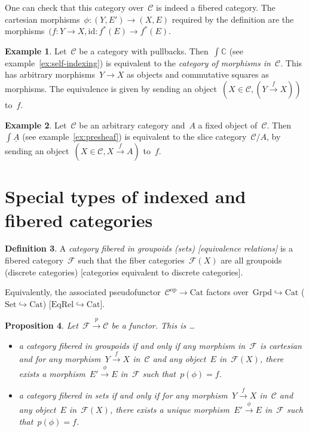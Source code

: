 \documentclass[a4paper,english,12pt]{scrartcl}
\theoremstyle{definition}
\newtheorem{defn}{Definition}[section]
\newtheorem{ex}[defn]{Example}
\theoremstyle{plain}
\newtheorem{prop}[defn]{Proposition}
\theoremstyle{remark}
\newcommand{\CC}{\mathbb{C}}
\newcommand{\C}{\mathcal{C}}
\newcommand{\F}{\mathcal{F}}
\newcommand{\id}{\mathrm{id}}
\newcommand{\op}{\mathrm{op}}
\newcommand{\xra}[1]{\xrightarrow{#1}}
\newcommand{\Set}{\mathrm{Set}}
\newcommand{\Cat}{\mathrm{Cat}}
\newcommand{\ul}[1]{\underline{#1}}
\begin{document}
One can check that this category over~$\C$ is indeed a fibered category. The
cartesian morphisms~$\phi : (Y,E') \to (X,E)$ required by the definition are
the morphisms~$(f : Y \to X, \id : f^*(E) \to f^*(E)$.

\begin{ex}Let~$\C$ be a category with pullbacks. Then~$\int \CC$ (see
example~\ref{ex:self-indexing}) is equivalent to the \emph{category of morphisms
in~$\C$}. This has arbitrary morphisms~$Y \to X$ as objects and commutative
squares as morphisms. The equivalence is given by sending an object~$(X \in \C,
(Y \xra{f} X))$ to~$f$.
\end{ex}

\begin{ex}Let~$\C$ be an arbitrary category and~$A$ a fixed object of~$\C$.
Then~$\int \ul{A}$ (see example~\ref{ex:presheaf}) is
equivalent to the slice category~$\C/A$, by sending an object~$(X \in \C, X
\xra{f} A)$ to~$f$.
\end{ex}


\section{Special types of indexed and fibered categories}

\begin{defn}A \emph{category fibered in groupoids (sets) [equivalence relations]}
is a fibered category~$\F$ such that the fiber categories~$\F(X)$ are all
groupoids (discrete categories) [categories equivalent to discrete
categories].\end{defn}

Equivalently, the associated pseudofunctor~$\C^\op \to \Cat$ factors
over~$\mathrm{Grpd} \hookrightarrow \Cat$ ($\Set \hookrightarrow
\Cat$) [$\mathrm{EqRel} \hookrightarrow \Cat$].

\begin{prop}Let~$\F \xra{p} \C$ be a functor. This is \ldots
\begin{itemize}
\item a category fibered in groupoids if and only if any morphism
in~$\F$ is cartesian and for any morphism~$Y \xra{f} X$ in~$\C$ and any
object~$E$ in~$\F(X)$, there exists a morphism~$E' \xra{\phi} E$ in~$\F$ such
that~$p(\phi) = f$.
\item a category fibered in sets if and only if
for any morphism~$Y \xra{f} X$ in~$\C$ and any
object~$E$ in~$\F(X)$, there exists a unique morphism~$E' \xra{\phi} E$ in~$\F$ such
that~$p(\phi) = f$.
\end{itemize}
\end{prop}
\end{document}
